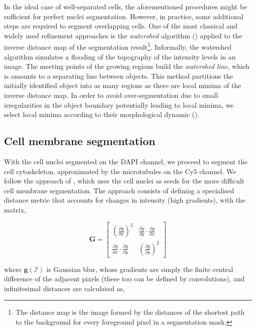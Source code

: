 In the ideal case of well-separated cells, the aforementioned procedures might be sufficient for perfect nuclei segmentation. However, in practice, some additional steps are required to segment overlapping cells. One of the most classical and widely used refinement approaches is the \emph{watershed} algorithm (\cite{beucher1979use}) applied to the inverse distance map of the segmentation result\footnote{The distance map is the image formed by the distances of the shortest path to the background for every foreground pixel in a segmentation mask.}. Informally, the watershed algorithm simulates a flooding of the topography of the intensity levels in an image. The meeting points of the growing regions build the \emph{watershed line}, which is amounts to a separating line between objects. This method partitions the initially identified object into as many regions as there are local minima of the inverse distance map. In order to avoid over-segmentation due to small irregularities in the object boundary potentially leading to local minima, we select local minima according to their morphological dynamic (\cite{Grimaud1992}).

\subsection{Cell membrane segmentation}

With the cell nuclei segmented on the DAPI channel, we proceed to segment the cell cytoskeleton, approximated by the microtubules on the Cy5 channel. We follow the approach of \cite{jones2005voronoi}, which uses the cell nuclei as seeds for the more difficult cell membrane segmentation. The approach consists of defining a specialised distance metric that accounts for changes in intensity (high gradients), with the matrix,

\begin{equation}
\mathbf{G} = \begin{bmatrix}
(\frac{\partial g}{\partial x})^2 & \frac{\partial g}{\partial y}\cdot\frac{\partial g}{\partial x}\\
\frac{\partial g}{\partial x}\cdot\frac{\partial g}{\partial y} & (\frac{\partial g}{\partial y})^2
\end{bmatrix}
\end{equation}

where $\mathbf{g}(\mathcal{I})$ is Gaussian blur, whose gradients are simply the finite central difference of the adjacent pixels (these too can be defined by convolutions), and infinitesimal distances are calculated as,

